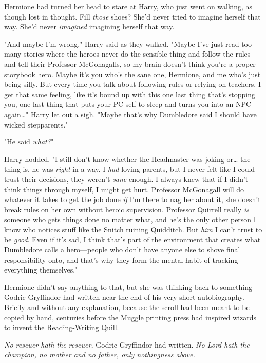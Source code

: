 Hermione had turned her head to stare at Harry, who just went on walking, as
though lost in thought. Fill \emph{those} shoes? She'd never tried to imagine
herself that way. She'd never \emph{imagined} imagining herself that way.

"And maybe I'm wrong," Harry said as they walked. "Maybe I've just read too
many stories where the heroes never do the sensible thing and follow the rules
and tell their Professor McGonagalls, so my brain doesn't think you're a proper
storybook hero. Maybe it's you who's the sane one, Hermione, and me who's just
being silly. But every time you talk about following rules or relying on
teachers, I get that same feeling, like it's bound up with this one last thing
that's stopping you, one last thing that puts your PC self to sleep and turns
you into an NPC again{\ldots}" Harry let out a sigh. "Maybe that's why
Dumbledore said I should have wicked stepparents."

"He said \emph{what?}"

Harry nodded. "I still don't know whether the Headmaster was joking or{\ldots}
the thing is, he was \emph{right} in a way. I \emph{had} loving parents, but I
never felt like I could trust their decisions, they weren't \emph{sane} enough.
I always knew that if I didn't think things through myself, I might get hurt.
Professor McGonagall will do whatever it takes to get the job done \emph{if}
I'm there to nag her about it, she doesn't break rules on her own without
heroic supervision. Professor Quirrell really \emph{is} someone who gets things
done no matter what, and he's the only other person I know who notices stuff
like the Snitch ruining Quidditch. But \emph{him} I can't trust to be
\emph{good}. Even if it's sad, I think that's part of the environment that
creates what Dumbledore calls a hero---people who don't have anyone else to
shove final responsibility onto, and that's why they form the mental habit of
tracking everything themselves."

Hermione didn't say anything to that, but she was thinking back to something
Godric Gryffindor had written near the end of his very short autobiography.
Briefly and without any explanation, because the scroll had been meant to be
copied by hand, centuries before the Muggle printing press had inspired wizards
to invent the Reading-Writing Quill.

\emph{No rescuer hath the rescuer,} Godric Gryffindor had written. \emph{No
Lord hath the champion, no mother and no father, only nothingness above.}

